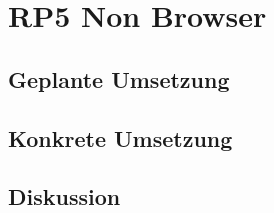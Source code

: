 \section{RP5 Non Browser}
\label{sec:principle-rp5-non-browser}

\subsection*{Geplante Umsetzung}


\subsection*{Konkrete Umsetzung}


\subsection*{Diskussion}
